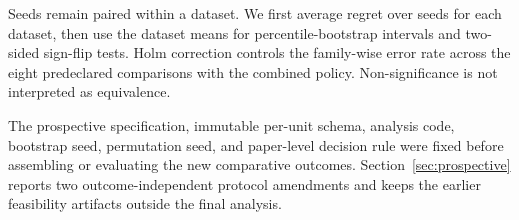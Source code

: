 Seeds remain paired within a dataset. We first average regret over seeds for each dataset, then use the dataset means for percentile-bootstrap intervals and two-sided sign-flip tests. Holm correction controls the family-wise error rate across the eight predeclared comparisons with the combined policy. Non-significance is not interpreted as equivalence.

The prospective specification, immutable per-unit schema, analysis code, bootstrap seed, permutation seed, and paper-level decision rule were fixed before assembling or evaluating the new comparative outcomes. Section~\ref{sec:prospective} reports two outcome-independent protocol amendments and keeps the earlier feasibility artifacts outside the final analysis.
